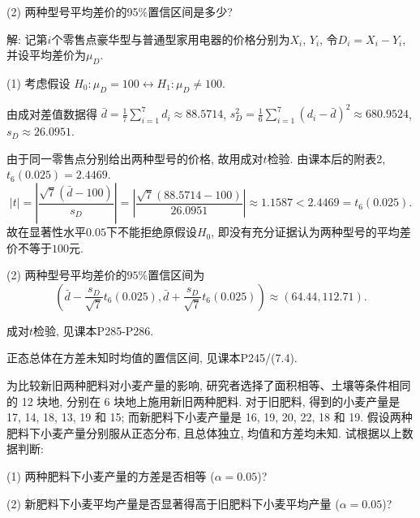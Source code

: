 \documentclass[standard]{ExBook}
\renewenvironment{shaded}{%
  \def\FrameCommand{\fboxsep=\FrameSep \colorbox{shadecolor}}%
  \MakeFramed{\advance\hsize-\width \FrameRestore}%
}{%
  \endMakeFramed
}
\begin{document}
\begin{qitems}
\begin{bbox}
\begin{shaded}
(2) 两种型号平均差价的95\%置信区间是多少?
    \end{shaded}
    \end{bbox}

\vspace{\dimexpr2.5cm-5em\relax}

解: 记第$i$个零售点豪华型与普通型家用电器的价格分别为$X_i$, $Y_i$, 令$D_i=X_i-Y_i$, 并设平均差价为$\mu_D$.

(1) 考虑假设
$
H_0:\mu_D=100
\longleftrightarrow
H_1:\mu_D\neq100
$.

由成对差值数据得
$
\bar{d}
=\frac{1}{7}\sum_{i=1}^{7}d_i
\approx88.5714
$,
$
s_D^2
=\frac{1}{6}\sum_{i=1}^{7}(d_i-\bar{d})^2
\approx680.9524
$,
$
s_D\approx26.0951
$.

由于同一零售点分别给出两种型号的价格, 故用成对$t$检验. 由课本后的附表2, $t_6(0.025)=2.4469$.
$$
|t|
=
\left|
\frac{\sqrt{7}(\bar{d}-100)}{s_D}
\right|
=
\left|
\frac{\sqrt{7}(88.5714-100)}{26.0951}
\right|
\approx1.1587
<
2.4469
=
t_6(0.025).
$$
故在显著性水平$0.05$下不能拒绝原假设$H_0$, 即没有充分证据认为两种型号的平均差价不等于$100$元.

(2) 两种型号平均差价的$95\%$置信区间为
$$
\left(
\bar{d}-\frac{s_D}{\sqrt{7}}t_6(0.025),
\bar{d}+\frac{s_D}{\sqrt{7}}t_6(0.025)
\right)
\approx
(64.44,112.71).
$$

\textcolor{themeColor}{\selectfont {} 成对$t$检验, 见课本P285-P286.}

\textcolor{themeColor}{\selectfont {} 正态总体在方差未知时均值的置信区间, 见课本P245/(7.4).}

\vspace{2.5cm-5em}

    \begin{bbox}
    \begin{shaded}
        \qitem
为比较新旧两种肥料对小麦产量的影响, 研究者选择了面积相等、土壤等条件相同的 12 块地, 分别在 6 块地上施用新旧两种肥料. 对于旧肥料, 得到的小麦产量是 17, 14, 18, 13, 19 和 15; 而新肥料下小麦产量是 16, 19, 20, 22, 18 和 19. 假设两种肥料下小麦产量分别服从正态分布, 且总体独立, 均值和方差均未知. 试根据以上数据判断:

(1) 两种肥料下小麦产量的方差是否相等 ($\alpha=0.05$)?

(2) 新肥料下小麦平均产量是否显著得高于旧肥料下小麦平均产量 ($\alpha=0.05$)?
    \end{shaded}
    \end{bbox}

\vspace{\dimexpr2.5cm-5em\relax}


\end{qitems}
\end{document}
